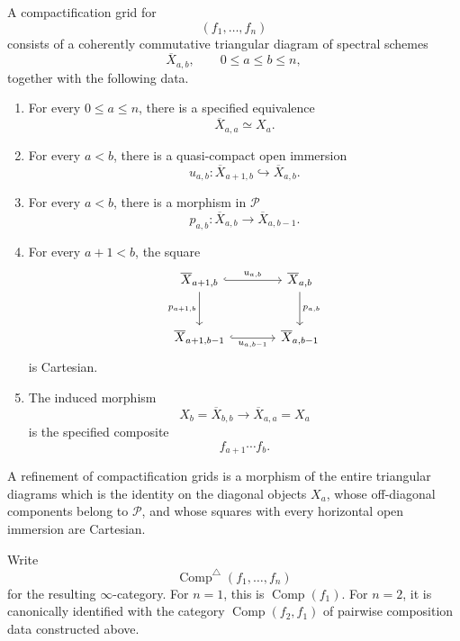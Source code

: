 \begin{definition}
\label{def:finite-compactification-grid}
A compactification grid for
\[
    (f_1,\ldots,f_n)
\]
consists of a coherently commutative triangular diagram of spectral schemes
\[
    \overline X_{a,b},
    \qquad
    0\leq a\leq b\leq n,
\]
together with the following data.

\begin{enumerate}
    \item For every \(0\leq a\leq n\), there is a specified equivalence
    \[
        \overline X_{a,a}
        \simeq
        X_a.
    \]

    \item For every \(a<b\), there is a quasi-compact open immersion
    \[
        u_{a,b}:
        \overline X_{a+1,b}
        \hookrightarrow
        \overline X_{a,b}.
    \]

    \item For every \(a<b\), there is a morphism in \(\mathcal P\)
    \[
        p_{a,b}:
        \overline X_{a,b}
        \longrightarrow
        \overline X_{a,b-1}.
    \]

    \item For every \(a+1<b\), the square
    \[
    \begin{tikzcd}[column sep=large,row sep=large]
        \overline X_{a+1,b}
            \arrow[r,hook,"u_{a,b}"]
            \arrow[d,"p_{a+1,b}"']
            &
        \overline X_{a,b}
            \arrow[d,"p_{a,b}"]
        \\
        \overline X_{a+1,b-1}
            \arrow[r,hook,"u_{a,b-1}"']
            &
        \overline X_{a,b-1}
    \end{tikzcd}
    \]
    is Cartesian.

    \item The induced morphism
    \[
        X_b
        =
        \overline X_{b,b}
        \longrightarrow
        \overline X_{a,a}
        =
        X_a
    \]
    is the specified composite
    \[
        f_{a+1}\cdots f_b.
    \]
\end{enumerate}

A refinement of compactification grids is a morphism of the entire
triangular diagrams which is the identity on the diagonal objects \(X_a\),
whose off-diagonal components belong to \(\mathcal P\), and whose squares
with every horizontal open immersion are Cartesian.

Write
\[
    \operatorname{Comp}^{\triangle}
    (f_1,\ldots,f_n)
\]
for the resulting \(\infty\)-category.  For \(n=1\), this is
\(\operatorname{Comp}(f_1)\).  For \(n=2\), it is canonically identified
with the category \(\operatorname{Comp}(f_2,f_1)\) of pairwise composition
data constructed above.
\end{definition}

